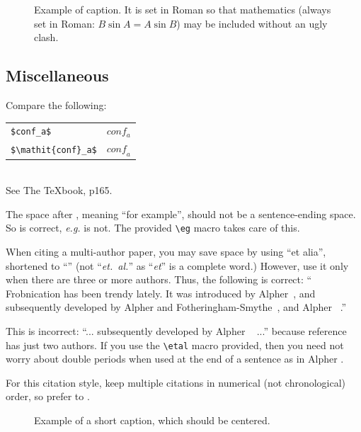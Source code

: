 \documentclass[10pt,twocolumn,letterpaper]{article}
\begin{document}
\begin{figure}[t]
   \begin{center}
      \fbox{\rule{0pt}{2in} \rule{0.9\linewidth}{0pt}}
   \end{center}
   \caption{Example of caption.  It is set in Roman so that mathematics
      (always set in Roman: $B \sin A = A \sin B$) may be included without an
      ugly clash.}
   \label{fig:long}
   \label{fig:onecol}
\end{figure}

\subsection{Miscellaneous}

\noindent
Compare the following:\\
\begin{tabular}{ll}
   \verb'$conf_a$' & $conf_a$          \\
   \verb'$\mathit{conf}_a$' & $\mathit{conf}_a$
\end{tabular}\\
See The \TeX book, p165.

The space after \eg, meaning ``for example'', should not be a
sentence-ending space. So \eg is correct, {\em e.g.} is not.  The provided
\verb'\eg' macro takes care of this.

When citing a multi-author paper, you may save space by using ``et alia'',
shortened to ``\etal'' (not ``{\em et.\ al.}'' as ``{\em et}'' is a complete word.)
However, use it only when there are three or more authors.  Thus, the
following is correct: ``
Frobnication has been trendy lately.
It was introduced by Alpher~\cite{Alpher02}, and subsequently developed by
Alpher and Fotheringham-Smythe~\cite{Alpher03}, and Alpher \etal~\cite{Alpher04}.''

This is incorrect: ``... subsequently developed by Alpher \etal~\cite{Alpher03} ...''
because reference~\cite{Alpher03} has just two authors.  If you use the
\verb'\etal' macro provided, then you need not worry about double periods
when used at the end of a sentence as in Alpher \etal.

For this citation style, keep multiple citations in numerical (not
chronological) order, so prefer \cite{Alpher03,Alpher02,Authors14} to
\cite{Alpher02,Alpher03,Authors14}.


\begin{figure}
   \begin{center}
      \fbox{\rule{0pt}{2in} \rule{.9\linewidth}{0pt}}
   \end{center}
   \caption{Example of a short caption, which should be centered.}
   \label{fig:short}
\end{figure}
\end{document}
